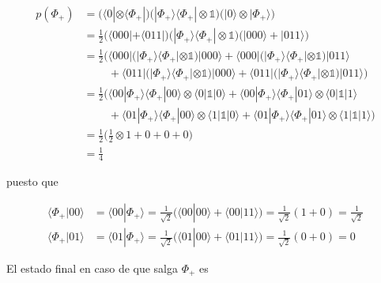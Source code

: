 \documentclass{article}
\begin{document}
\begin{align*}
  p(\Phi_+) 
    &= \Big(\langle 0| \otimes \langle \Phi_+|\Big)
       \Big(|\Phi_+\rangle\langle\Phi_+|\otimes \mathbb{1}\Big)  
       \Big(|0\rangle \otimes |\Phi_+\rangle\Big) \\
    &= \frac{1}{2}
    \Big(\langle 000| + \langle 011|\Big)
    \Big(|\Phi_+\rangle\langle \Phi_+| \otimes \mathbb{1}\Big)
    \Big(|000\rangle + |011\rangle\Big) \\
    &= \frac{1}{2}
      \Big(\langle 000|
        \big(|\Phi_+ \rangle\langle \Phi_+|\otimes \mathbb{1}\big)
      |000\rangle +
      \langle 000|
        \big(|\Phi_+ \rangle\langle \Phi_+|\otimes \mathbb{1}\big)
      |011\rangle \\ &\;\;\;\;\;\;\;\;+
      \langle 011|
        \big(|\Phi_+ \rangle\langle \Phi_+|\otimes \mathbb{1}\big)
      |000\rangle +
      \langle 011|
        \big(|\Phi_+ \rangle\langle \Phi_+|\otimes \mathbb{1}\big)
      |011\rangle
    \Big) \\
    &= \frac{1}{2}\Big(
      \langle 00|\Phi_+ \rangle\langle \Phi_+|00\rangle
      \otimes 
      \langle 0|\mathbb{1}|0\rangle +
      \langle 00|\Phi_+ \rangle\langle \Phi_+|01\rangle
      \otimes 
      \langle 0|\mathbb{1}|1\rangle \\ &\;\;\;\;\;\;\;\;+
      \langle 01|\Phi_+ \rangle\langle \Phi_+|00\rangle
      \otimes 
      \langle 1|\mathbb{1}|0\rangle +
      \langle 01|\Phi_+ \rangle\langle \Phi_+|01\rangle
      \otimes 
      \langle 1|\mathbb{1}|1\rangle
      \Big) \\ 
   &= \frac{1}{2}\Big(
      \frac{1}{2} \otimes 1 + 0 + 0 + 0
      \Big) \\ 
   &= \frac{1}{4} 
\end{align*}

puesto que 

\begin{align*}
  \langle \Phi_+|00\rangle 
    &= \langle 00|\Phi_+\rangle 
    = \frac{1}{\sqrt{2}}\Big(
    \langle 00|00\rangle + \langle 00|11\rangle\Big)
    = \frac{1}{\sqrt{2}}(1 + 0)
    = \frac{1}{\sqrt{2}} \\
  \langle \Phi_+|01\rangle
    &=\langle 01|\Phi_+\rangle 
    = \frac{1}{\sqrt{2}}\Big(
      \langle 01|00\rangle + \langle 01|11\rangle\Big)
    = \frac{1}{\sqrt{2}}(0 + 0)
    = 0
\end{align*}

El estado final en caso de que salga $\Phi_+$ es 
\end{document}
